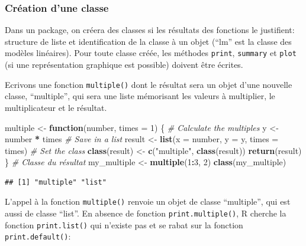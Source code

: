 \documentclass[
  12pt,
  french,
  a4paper,
  extrafontsizes,onecolumn,openright
  ]{memoir}
\newenvironment{Shaded}{\begin{snugshade}}{\end{snugshade}}
\newcommand{\CommentTok}[1]{\textcolor[rgb]{0.56,0.35,0.01}{\textit{#1}}}
\newcommand{\ControlFlowTok}[1]{\textcolor[rgb]{0.13,0.29,0.53}{\textbf{#1}}}
\newcommand{\DataTypeTok}[1]{\textcolor[rgb]{0.13,0.29,0.53}{#1}}
\newcommand{\DecValTok}[1]{\textcolor[rgb]{0.00,0.00,0.81}{#1}}
\newcommand{\KeywordTok}[1]{\textcolor[rgb]{0.13,0.29,0.53}{\textbf{#1}}}
\newcommand{\NormalTok}[1]{#1}
\newcommand{\OperatorTok}[1]{\textcolor[rgb]{0.81,0.36,0.00}{\textbf{#1}}}
\newcommand{\StringTok}[1]{\textcolor[rgb]{0.31,0.60,0.02}{#1}}
\begin{document}
\hypertarget{cruxe9ation-dune-classe}{%
\subsubsection{Création d'une classe}\label{cruxe9ation-dune-classe}}

Dans un package, on créera des classes si les résultats des fonctions le justifient: structure de liste et identification de la classe à un objet (\enquote{lm} est la classe des modèles linéaires).
Pour toute classe créée, les méthodes \texttt{print}, \texttt{summary} et \texttt{plot} (si une représentation graphique est possible) doivent être écrites.

Ecrivons une fonction \texttt{multiple()} dont le résultat sera un objet d'une nouvelle classe, \enquote{multiple}, qui sera une liste mémorisant les valeurs à multiplier, le multiplicateur et le résultat.

\scriptsize

\begin{Shaded}
\begin{Highlighting}[]
\NormalTok{multiple <-}\StringTok{ }\ControlFlowTok{function}\NormalTok{(number, }\DataTypeTok{times =} \DecValTok{1}\NormalTok{) \{}
    \CommentTok{# Calculate the multiples}
\NormalTok{    y <-}\StringTok{ }\NormalTok{number }\OperatorTok{*}\StringTok{ }\NormalTok{times}
    \CommentTok{# Save in a list}
\NormalTok{    result <-}\StringTok{ }\KeywordTok{list}\NormalTok{(}\DataTypeTok{x =}\NormalTok{ number, }\DataTypeTok{y =}\NormalTok{ y, }\DataTypeTok{times =}\NormalTok{ times)}
    \CommentTok{# Set the class}
    \KeywordTok{class}\NormalTok{(result) <-}\StringTok{ }\KeywordTok{c}\NormalTok{(}\StringTok{"multiple"}\NormalTok{, }\KeywordTok{class}\NormalTok{(result))}
    \KeywordTok{return}\NormalTok{(result)}
\NormalTok{\}}
\CommentTok{# Classe du résultat}
\NormalTok{my_multiple <-}\StringTok{ }\KeywordTok{multiple}\NormalTok{(}\DecValTok{1}\OperatorTok{:}\DecValTok{3}\NormalTok{, }\DecValTok{2}\NormalTok{)}
\KeywordTok{class}\NormalTok{(my_multiple)}
\end{Highlighting}
\end{Shaded}

\begin{verbatim}
## [1] "multiple" "list"
\end{verbatim}

\normalsize

L'appel à la fonction \texttt{multiple()} renvoie un objet de classe \enquote{multiple}, qui est aussi de classe \enquote{list}.
En absence de fonction \texttt{print.multiple()}, R cherche la fonction \texttt{print.list()} qui n'existe pas et se rabat sur la fonction \texttt{print.default()}:
\end{document}
